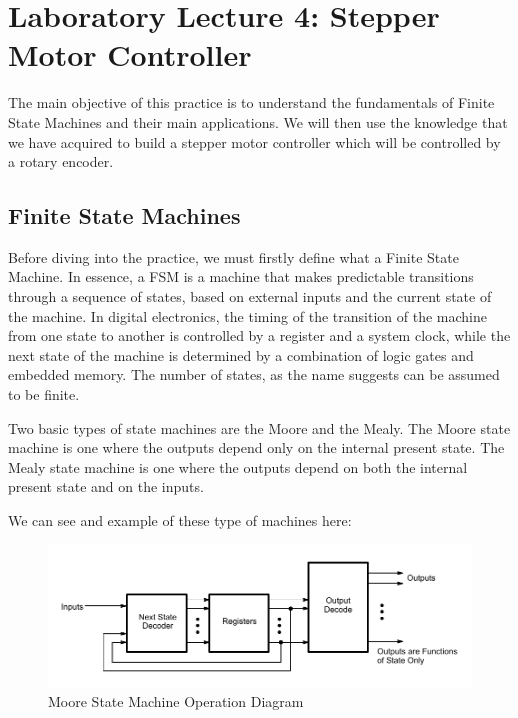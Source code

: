 \section{Laboratory Lecture 4: Stepper Motor Controller}

The main objective of this practice is to understand the fundamentals of Finite State Machines and their main applications. We will then use the knowledge that we have acquired to build a stepper motor controller which will be controlled by a rotary encoder.

\subsection{Finite State Machines}

Before diving into the practice, we must firstly define what a Finite State Machine. In essence, a FSM is a machine that makes predictable transitions through a sequence of states, based on external inputs and the current state of the machine. In digital electronics, the timing of the transition of the machine from one state to another is controlled by a register and a system clock, while the next state of the machine is determined by a combination of logic gates and embedded memory. The number of states, as the name suggests can be assumed to be finite. ~\autocite{FSM} \medskip

Two basic types of state machines are the Moore and the Mealy. The Moore state machine is one where the outputs depend only on the internal present state. The Mealy state machine is one where the outputs depend on both the internal present state and on the inputs. ~\autocite{FLOYD} \medskip

We can see and example of these type of machines here:


\begin{figure}[H]
    \centering
    \includegraphics[width = \textwidth]{Graphics/Practice 4/MOORE.pdf}
    \caption{Moore State Machine Operation Diagram ~\autocite{AMD}}
    \label{fig:MOORE}
\end{figure}


